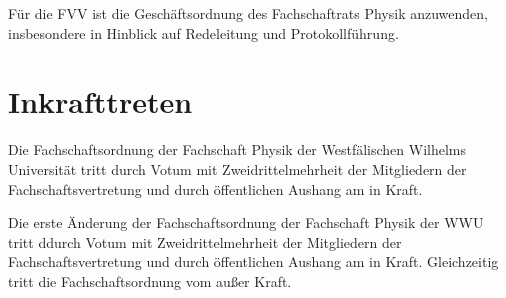 \documentclass[
	a4paper,
	12pt,
	oneside,
	parskip=half-,
	pagesize,
	headsepline,
	german,
	ngerman
]{scrartcl}
\begin{document}
Für die FVV ist die Geschäftsordnung des Fachschaftrats Physik anzuwenden, insbesondere in Hinblick auf Redeleitung und Protokollführung.

\section{Inkrafttreten}
Die Fachschaftsordnung der Fachschaft Physik der Westfälischen Wilhelms Universität tritt durch Votum mit Zweidrittelmehrheit der Mitgliedern der Fachschaftsvertretung und durch öffentlichen Aushang am  in Kraft.

Die erste Änderung der Fachschaftsordnung der Fachschaft Physik der WWU tritt ddurch Votum mit Zweidrittelmehrheit der Mitgliedern der Fachschaftsvertretung und durch öffentlichen Aushang am  in Kraft. Gleichzeitig tritt die Fachschaftsordnung vom  außer Kraft.
\end{document}
